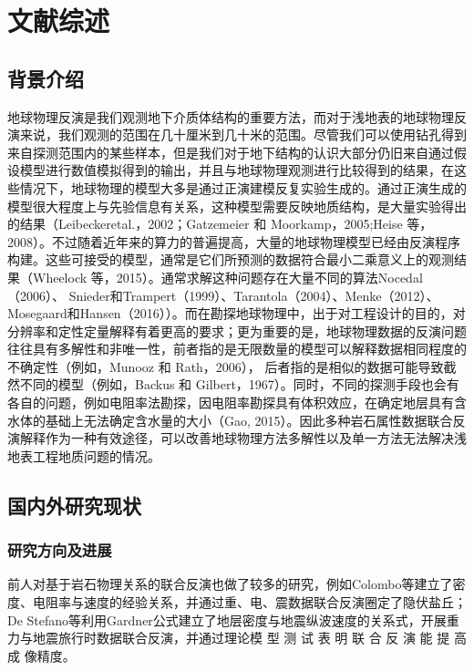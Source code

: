 \cleardoublepage
\newrefsection
\chapter{文献综述}

\section{背景介绍}

地球物理反演是我们观测地下介质体结构的重要方法，而对于浅地表的地球物理反演来说，我们观测的范围在几十厘米到几十米的范围。尽管我们可以使用钻孔得到来自探测范围内的某些样本，但是我们对于地下结构的认识大部分仍旧来自通过假设模型进行数值模拟得到的输出，并且与地球物理观测进行比较得到的结果，在这些情况下，地球物理的模型大多是通过正演建模反复实验生成的。通过正演生成的模型很大程度上与先验信息有关系，这种模型需要反映地质结构，是大量实验得出的结果（Leibeckeretal.，2002；Gatzemeier 和 Moorkamp，2005;Heise 等，2008）。不过随着近年来的算力的普遍提高，大量的地球物理模型已经由反演程序构建。这些可接受的模型，通常是它们所预测的数据符合最小二乘意义上的观测结果（Wheelock 等，2015）。通常求解这种问题存在大量不同的算法Nocedal（2006）、 Snieder和Trampert（1999）、Tarantola（2004）、Menke（2012）、Mosegaard和Hansen（2016））。而在勘探地球物理中，出于对工程设计的目的，对分辨率和定性定量解释有着更高的要求；更为重要的是，地球物理数据的反演问题往往具有多解性和非唯一性，前者指的是无限数量的模型可以解释数据相同程度的不确定性（例如，Munooz 和 Rath，2006）， 后者指的是相似的数据可能导致截然不同的模型（例如，Backus 和 Gilbert，1967）。同时，不同的探测手段也会有各自的问题，例如电阻率法勘探，因电阻率勘探具有体积效应，在确定地层具有含水体的基础上无法确定含水量的大小（Gao, 2015）。因此多种岩石属性数据联合反演解释作为一种有效途径，可以改善地球物理方法多解性以及单一方法无法解决浅地表工程地质问题的情况。\cite{zjuthesisrules}
\newpage
\section{国内外研究现状}

\subsection{研究方向及进展}

前人对基于岩石物理关系的联合反演也做了较多的研究，例如Colombo等建立了密度、电阻率与速度的经验关系，并通过重、电、震数据联合反演圈定了隐伏盐丘；De Stefano等利用Gardner公式建立了地层密度与地震纵波速度的关系式，开展重力与地震旅行时数据联合反演，并通过理论模 型 测 试 表 明 联 合 反 演 能 提 高 成 像精度。


